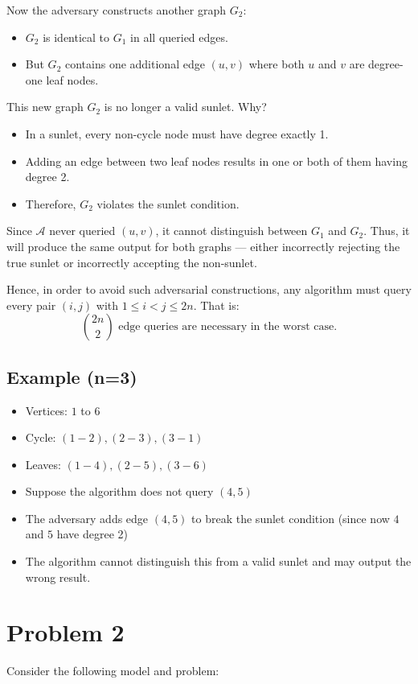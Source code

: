 \documentclass[12pt]{article}
\begin{document}
	Now the adversary constructs another graph $G_2$:
	\begin{itemize}
		\item $G_2$ is identical to $G_1$ in all queried edges.
		\item But $G_2$ contains one additional edge $(u, v)$ where both $u$ and $v$ are degree-one leaf nodes.
	\end{itemize}
	
	This new graph $G_2$ is no longer a valid sunlet. Why?
	\begin{itemize}
		\item In a sunlet, every non-cycle node must have degree exactly 1.
		\item Adding an edge between two leaf nodes results in one or both of them having degree 2.
		\item Therefore, $G_2$ violates the sunlet condition.
	\end{itemize}
	
	Since $\mathcal{A}$ never queried $(u,v)$, it cannot distinguish between $G_1$ and $G_2$. Thus, it will produce the same output for both graphs — either incorrectly rejecting the true sunlet or incorrectly accepting the non-sunlet.
	
	Hence, in order to avoid such adversarial constructions, any algorithm must query every pair $(i, j)$ with $1 \le i < j \le 2n$. That is:
	\[
	\boxed{\binom{2n}{2}} \text{ edge queries are necessary in the worst case.}
	\]
	
	\subsection*{Example (n=3)}
	\begin{itemize}
		\item Vertices: $1$ to $6$
		\item Cycle: $(1{-}2), (2{-}3), (3{-}1)$
		\item Leaves: $(1{-}4), (2{-}5), (3{-}6)$
		\item Suppose the algorithm does not query $(4,5)$
		\item The adversary adds edge $(4,5)$ to break the sunlet condition (since now $4$ and $5$ have degree 2)
		\item The algorithm cannot distinguish this from a valid sunlet and may output the wrong result.
	\end{itemize}
	
	\vspace{1em}
	
	\section*{Problem 2}
	Consider the following model and problem:
	
\end{document}
